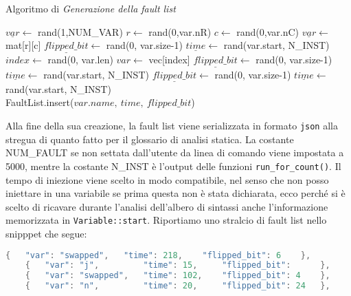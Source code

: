 \begin{algorithm}
    \caption{Algoritmo di \textit{Generazione della fault list}}
    \begin{algorithmic}
            \State $\underline{var} \gets$ rand(1,NUM\_VAR)
                \State $r \gets$ rand(0,var.nR) 
                \State $c \gets$ rand(0,var.nC) 
                \State $\underline{var} \gets$ mat[r][c]
                \State $\underline{flipped\_bit} \gets$ rand(0, var.size-1) 
                \State $\underline{time} \gets$ rand(var.start, N\_INST)
                \State $index \gets$ rand(0, var.len)
                \State $var \gets$ vec[index]
                \State $\underline{flipped\_bit} \gets$ rand(0, var.size-1) 
                \State $\underline{time} \gets$  rand(var.start, N\_INST) 
            \Else
                \State $\underline{flipped\_bit} \gets$ rand(0, var.size-1) 
                \State $\underline{time} \gets$  rand(var.start, N\_INST) 
            \EndIf \\
            FaultList.insert($var.name,\ time, \  flipped\_bit$) 
        \EndFor
    \end{algorithmic}
\end{algorithm}
Alla fine della sua creazione, la fault list viene serializzata in formato \texttt{json} alla stregua di quanto fatto per il glossario di analisi statica. La costante NUM\_FAULT se non settata dall'utente da linea di comando viene impostata a 5000, mentre la costante N\_INST è l'output delle funzioni \texttt{run\_for\_count()}. Il tempo di iniezione viene scelto in modo compatibile, nel senso che non posso iniettare in una variabile se prima questa non è stata dichiarata, ecco perché si è scelto di ricavare durante l'analisi dell'albero di sintassi anche l'informazione memorizzata in \texttt{Variable::start}. Riportiamo uno stralcio di fault list nello snipppet che segue:

\begin{lstlisting}[language=rust, style=boxed]
    {   "var": "swapped",   "time": 218,    "flipped_bit": 6    },
    {   "var": "j",         "time": 15,     "flipped_bit":      },
    {   "var": "swapped",   "time": 102,    "flipped_bit": 4    },
    {   "var": "n",         "time": 20,     "flipped_bit": 24   },
\end{lstlisting}

